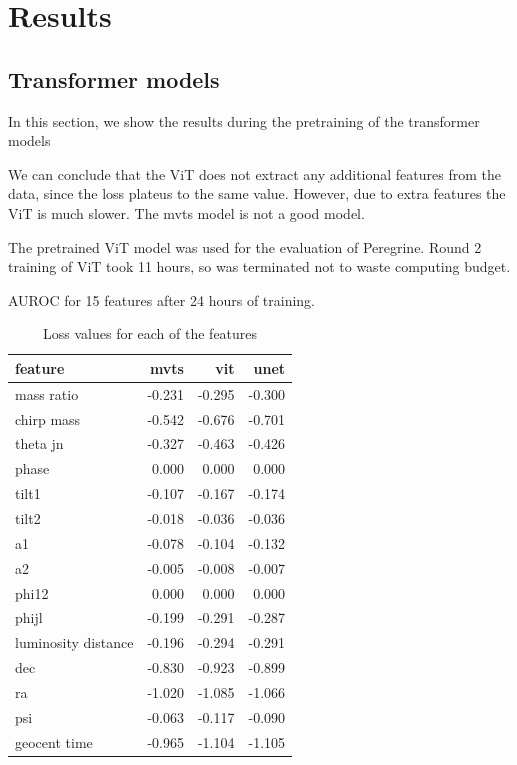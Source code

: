 \section{Results}
\label{sec:results}

\subsection{Transformer models}

In this section, we show the results during the pretraining of the transformer models

We can conclude that the ViT does not extract any additional features from the data, since the loss plateus to the same value. However, due to extra features the ViT is much slower. The mvts model is not a good model.

The pretrained ViT model was used for the evaluation of Peregrine. Round 2 training of ViT took 11 hours, so was terminated not to waste computing budget.

AUROC for 15 features after 24 hours of training.

\begin{table}
    \caption{Loss values for each of the features}
    \begin{tabular}{lrrr}
    \toprule
    feature & mvts & vit & unet \\
    \midrule
    mass ratio & -0.231 & -0.295 & -0.300 \\
    chirp mass & -0.542 & -0.676 & -0.701 \\
    theta jn & -0.327 & -0.463 & -0.426 \\
    phase & 0.000 & 0.000 & 0.000 \\
    tilt1 & -0.107 & -0.167 & -0.174 \\
    tilt2 & -0.018 & -0.036 & -0.036 \\
    a1 & -0.078 & -0.104 & -0.132 \\
    a2 & -0.005 & -0.008 & -0.007 \\
    phi12 & 0.000 & 0.000 & 0.000 \\
    phijl & -0.199 & -0.291 & -0.287 \\
    luminosity distance & -0.196 & -0.294 & -0.291 \\
    dec & -0.830 & -0.923 & -0.899 \\
    ra & -1.020 & -1.085 & -1.066 \\
    psi & -0.063 & -0.117 & -0.090 \\
    geocent time & -0.965 & -1.104 & -1.105 \\
    \bottomrule
    \end{tabular}
\end{table}

